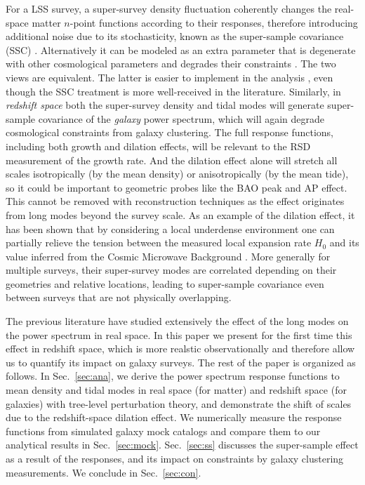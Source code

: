 \documentclass[a4paper,11pt]{article}
\begin{document}
For a LSS survey, a super-survey density fluctuation coherently changes the
real-space matter $n$-point functions according to their responses, therefore
introducing additional noise due to its stochasticity, known as the super-sample
covariance (SSC) \cite{HamiltonRimesEtAl06, SefusattiCrocceEtAl06,
TakadaBridle07, TakadaJain09, SatoEtAl09, TakahashiEtAl09, SchneiderColeEtAl11,
dePutterEtAl12, TakadaHu13, LiHuEtAl14, MohammedSeljak14, SchaanEtAl14,
MohammedSeljakVlah17, HowlettPercival17, ChanDizgahEtAl17}.
Alternatively it can be modeled as an extra parameter that is degenerate with
other cosmological parameters and degrades their constraints \cite{LiHuEtAl14sss}.
The two views are equivalent.
The latter is easier to implement in the analysis \cite{LiHuEtAl14sss}, even
though the SSC treatment is more well-received in the literature.
Similarly, in \emph{redshift space} both the super-survey density and tidal modes will
generate super-sample covariance of the \emph{galaxy} power spectrum, which will again
degrade cosmological constraints from galaxy clustering.
The full response functions, including both growth and dilation effects, will be
relevant to the RSD measurement of the growth rate.
And the dilation effect alone will stretch all scales isotropically (by the mean
density) or anisotropically (by the mean tide), so it could be important to geometric
probes like the BAO peak and AP effect.
This cannot be removed with reconstruction techniques \cite{EisensteinSeoEtAl07}
as the effect originates from long modes beyond the survey scale.
As an example of the dilation effect, it has been shown that by considering a local underdense
environment one can partially relieve the tension between the measured local
expansion rate $H_0$ and its value inferred from the Cosmic Microwave
Background \cite{MarraAmendolaEtAl13, WojtakKnebeEtAl14, Ben-DayanDurrerEtAl14,
IchikiYooEtAl16, OdderskovKoksbangEtAl16}.
More generally for multiple surveys, their super-survey modes are correlated
depending on their geometries and relative locations, leading to
super-sample covariance even between surveys that are not physically
overlapping.

The previous literature have studied extensively the effect of the long modes
on the power spectrum in real space.
In this paper we present for the first time this effect in redshift space,
which is more realstic observationally and therefore allow us to quantify its
impact on galaxy surveys.
The rest of the paper is organized as follows.
In Sec.~\ref{sec:ana}, we derive the power spectrum response functions to mean
density and tidal modes in real space (for matter) and redshift space (for
galaxies) with tree-level perturbation theory, and demonstrate the shift of
scales due to the redshift-space dilation effect.
We numerically measure the response functions from simulated galaxy mock
catalogs and compare
them to our analytical results in Sec.~\ref{sec:mock}.
Sec.~\ref{sec:ss} discusses the super-sample effect as a result of the
responses, and its impact on constraints by galaxy clustering measurements.
We conclude in Sec.~\ref{sec:con}.
\end{document}
